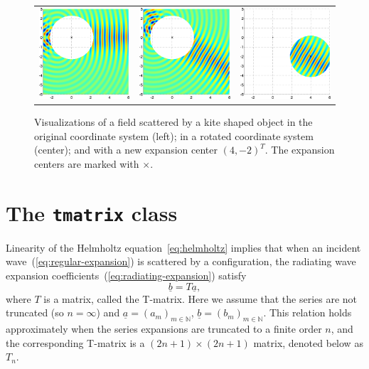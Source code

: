 \documentclass[12pt,letterpaper,final]{article}
\newcommand{\bbN}{\mathbb{N}}
\begin{document}
\begin{figure}[!ht]
\centering
\begin{tabular}{ccc}
\includegraphics[width=5cm]{addition_theorem_original.png} &
\includegraphics[width=5cm]{addition_theorem_rotated.png} &
\includegraphics[width=5cm]{addition_theorem_radiating_to_regular.png}
\end{tabular}
\caption{\label{fig:addition-theorem}
Visualizations of a  field scattered by a kite shaped object in the original coordinate system (left);
in a rotated coordinate system (center); and with a new expansion center
$(4,-2)^T$.
The expansion centers are marked with $\times$.}
\end{figure}


\section{The \texttt{tmatrix} class}

Linearity of the Helmholtz equation~\eqref{eq:helmholtz} implies that 
when an incident wave~(\ref{eq:regular-expansion}) is scattered by a configuration, 
the radiating wave expansion coefficients~(\ref{eq:radiating-expansion}) satisfy
\begin{equation}
\label{eq:tmatrix-product}
\underline{b} = T \underline{a},
\end{equation}
where $T$ is a matrix, called the T-matrix.
Here we assume that the 
series are not truncated (so $n=\infty$) and 
$\underline{a} = (a_m)_{m \in \bbN}$,
$\underline{b} = (b_m)_{m \in \bbN}$.
This relation holds approximately when the series expansions are truncated
to a finite order $n$, and the corresponding T-matrix is a 
$(2n+1) \times (2n+1)$ matrix, denoted below as $T_n$. 
\end{document}
